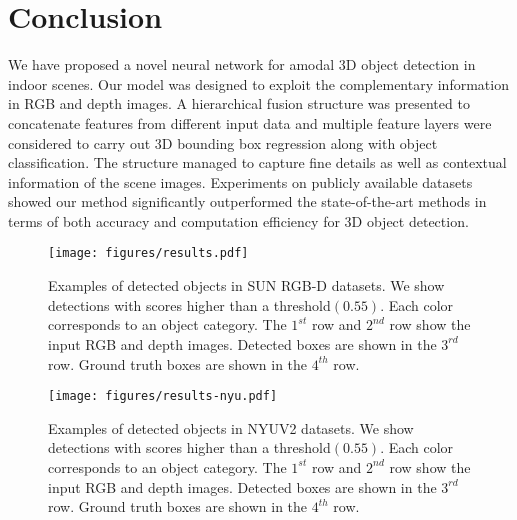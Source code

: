 \documentclass[10pt,twocolumn,letterpaper]{article}
\begin{document}
	\section{Conclusion}
	\vspace{-4mm} 
	We have proposed a novel neural network for amodal 3D object detection in indoor scenes. Our model was designed to exploit the complementary information in RGB and depth images. A hierarchical fusion structure was presented to concatenate features from different input data and multiple feature layers were considered to carry out 3D bounding box regression along with object classification. The structure managed to capture fine details as well as contextual information of the scene images. Experiments on publicly available datasets showed our method significantly outperformed the state-of-the-art methods in terms of both accuracy and computation efficiency for 3D object detection.\par
	\vspace{15mm} 
	\begin{figure*}[t]
		\vspace{-1mm} 
		\texttt{[image: figures/results.pdf]}
		\caption{{\small Examples of detected objects in SUN RGB-D datasets. We show detections with scores higher than a threshold$(0.55)$. Each color corresponds to an object category. The $1^{st}$ row  and $2^{nd}$ row show the input RGB and depth images. Detected boxes are shown in the $3^{rd}$ row. Ground truth boxes are shown in the $4^{th}$ row.}}
		\label{results}
	\end{figure*} 
	\begin{figure*}[t]
		\vspace{-1mm} 
		\centering
		\texttt{[image: figures/results-nyu.pdf]}
		\caption{{\small Examples of detected objects in NYUV2 datasets. We show detections with scores higher than a threshold$(0.55)$. Each color corresponds to an object category. The $1^{st}$ row  and $2^{nd}$ row show the input RGB and depth images. Detected boxes are shown in the $3^{rd}$ row. Ground truth boxes are shown in the $4^{th}$ row.}}
		\label{results-nyu}
	\end{figure*} 
	
	{\small
		
		
	}
	
\end{document}

